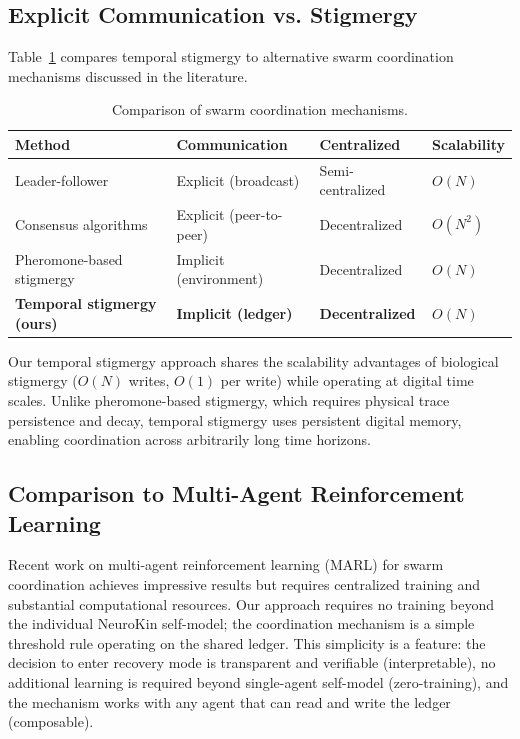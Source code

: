 \documentclass[12pt,a4paper,oneside]{report}
\begin{document}
\subsection{Explicit Communication vs. Stigmergy}
\label{subsec:explicit_communication_vs_stigmergy}

Table~\ref{tab:swarm_comparison_lit} compares temporal stigmergy to alternative swarm coordination mechanisms discussed in the literature.

\begin{table}[H]
\centering
\small
\setlength{\tabcolsep}{4pt}
\caption{Comparison of swarm coordination mechanisms.}
\label{tab:swarm_comparison_lit}
\begin{tabular}{>{\raggedright\arraybackslash}p{4.0cm} >{\raggedright\arraybackslash}p{4.0cm} >{\centering\arraybackslash}p{2.6cm} >{\centering\arraybackslash}p{2.6cm}}
\toprule
\textbf{Method} & \textbf{Communication} & \textbf{Centralized} & \textbf{Scalability} \\
\midrule
Leader-follower & Explicit (broadcast) & Semi-centralized & $O(N)$ \\
Consensus algorithms & Explicit (peer-to-peer) & Decentralized & $O(N^2)$ \\
Pheromone-based stigmergy & Implicit (environment) & Decentralized & $O(N)$ \\
\textbf{Temporal stigmergy (ours)} & \textbf{Implicit (ledger)} & \textbf{Decentralized} & \textbf{$O(N)$} \\
\bottomrule
\end{tabular}
\end{table}

Our temporal stigmergy approach shares the scalability advantages of biological stigmergy ($O(N)$ writes, $O(1)$ per write) while operating at digital time scales. Unlike pheromone-based stigmergy, which requires physical trace persistence and decay, temporal stigmergy uses persistent digital memory, enabling coordination across arbitrarily long time horizons.

\subsection{Comparison to Multi-Agent Reinforcement Learning}
\label{subsec:comparison_to_multi_agent_reinforcement_learning}

Recent work on multi-agent reinforcement learning (MARL) for swarm coordination \cite{domberg2026selfadapting, daneshmand2026slowrl} achieves impressive results but requires centralized training and substantial computational resources. Our approach requires no training beyond the individual NeuroKin self-model; the coordination mechanism is a simple threshold rule operating on the shared ledger. This simplicity is a feature: the decision to enter recovery mode is transparent and verifiable (interpretable), no additional learning is required beyond single-agent self-model (zero-training), and the mechanism works with any agent that can read and write the ledger (composable).
\end{document}
